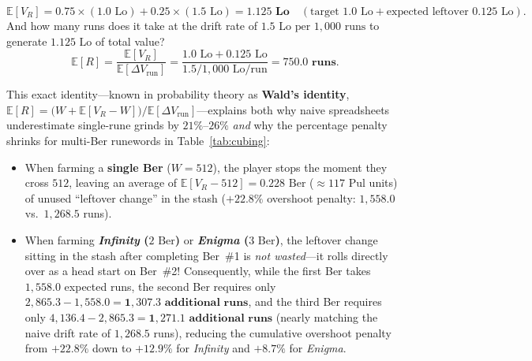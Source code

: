 \documentclass[11pt,reqno]{amsart}
\theoremstyle{definition}
\begin{document}
\begin{enumerate}
    \[
        \mathbb{E}[V_R] = 0.75 \times (1.0\text{ Lo}) + 0.25 \times (1.5\text{ Lo}) = \mathbf{1.125\text{ Lo}} \quad (\text{target } 1.0\text{ Lo} + \text{expected leftover } 0.125\text{ Lo}).
    \]
    And how many runs does it take at the drift rate of $1.5\text{ Lo per }1{,}000\text{ runs}$ to generate $1.125\text{ Lo}$ of total value?
    \[
        \mathbb{E}[R] = \frac{\mathbb{E}[V_R]}{\mathbb{E}[\Delta V_{\text{run}}]} = \frac{1.0\text{ Lo} + 0.125\text{ Lo}}{1.5 / 1{,}000\text{ Lo/run}} = \mathbf{750.0\text{ runs}}.
    \]
\end{enumerate}

This exact identity—known in probability theory as \textbf{Wald's identity}, $\mathbb{E}[R] = \big(W + \mathbb{E}[V_R - W]\big) / \mathbb{E}[\Delta V_{\text{run}}]$—explains both why naive spreadsheets underestimate single-rune grinds by $21\%$--$26\%$ \emph{and} why the percentage penalty shrinks for multi-Ber runewords in Table~\ref{tab:cubing}:
\begin{itemize}
    \item When farming a \textbf{single Ber} ($W = 512$), the player stops the moment they cross $512$, leaving an average of $\mathbb{E}[V_R - 512] = 0.228\text{ Ber}$ ($\approx 117$ Pul units) of unused ``leftover change'' in the stash ($+22.8\%$ overshoot penalty: $1{,}558.0$ vs.\ $1{,}268.5$ runs).
    \item When farming \textbf{\emph{Infinity} ($2\text{ Ber}$)} or \textbf{\emph{Enigma} ($3\text{ Ber}$)}, the leftover change sitting in the stash after completing Ber~\#1 is \emph{not wasted}—it rolls directly over as a head start on Ber~\#2! Consequently, while the first Ber takes $1{,}558.0$ expected runs, the second Ber requires only $2{,}865.3 - 1{,}558.0 = \mathbf{1{,}307.3\text{ additional runs}}$, and the third Ber requires only $4{,}136.4 - 2{,}865.3 = \mathbf{1{,}271.1\text{ additional runs}}$ (nearly matching the naive drift rate of $1{,}268.5$ runs), reducing the cumulative overshoot penalty from $+22.8\%$ down to $+12.9\%$ for \emph{Infinity} and $+8.7\%$ for \emph{Enigma}.
\end{itemize}
\end{document}
